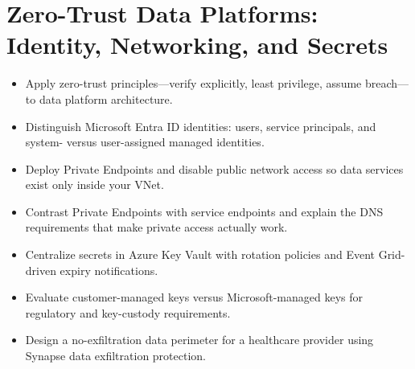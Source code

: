\chapter{Zero-Trust Data Platforms: Identity, Networking, and Secrets}
%
\begin{objectives}
\begin{itemize}
    \item Apply zero-trust principles---verify explicitly, least privilege, assume breach---to data platform architecture.
    \item Distinguish Microsoft Entra ID identities: users, service principals, and system- versus user-assigned managed identities.
    \item Deploy Private Endpoints and disable public network access so data services exist only inside your VNet.
    \item Contrast Private Endpoints with service endpoints and explain the DNS requirements that make private access actually work.
    \item Centralize secrets in Azure Key Vault with rotation policies and Event Grid-driven expiry notifications.
    \item Evaluate customer-managed keys versus Microsoft-managed keys for regulatory and key-custody requirements.
    \item Design a no-exfiltration data perimeter for a healthcare provider using Synapse data exfiltration protection.
\end{itemize}
\end{objectives}

